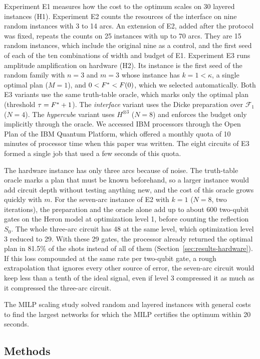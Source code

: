 Experiment E1 measures how the cost to the optimum scales on 30 layered instances (H1). Experiment E2 counts the resources of the interface on nine random instances with 3 to 14 arcs. An extension of E2, added after the protocol was fixed, repeats the counts on 25 instances with up to 70 arcs. They are 15 random instances, which include the original nine as a control, and the first seed of each of the ten combinations of width and budget of E1. Experiment E3 runs amplitude amplification on hardware (H2). Its instance is the first seed of the random family with $n=3$ and $m=3$ whose instance has $k=1<\kappa$, a single optimal plan ($M=1$), and $0<F^{*}<F(0)$, which we selected automatically. Both E3 variants use the same truth-table oracle, which marks only the optimal plan (threshold $\tau=F^{*}+1$). The \emph{interface} variant uses the Dicke preparation over $\mathcal{F}_1$ ($N=4$). The \emph{hypercube} variant uses $H^{\otimes 3}$ ($N=8$) and enforces the budget only implicitly through the oracle. We accessed IBM processors through the Open Plan of the IBM Quantum Platform, which offered a monthly quota of 10 minutes of processor time when this paper was written. The eight circuits of E3 formed a single job that used a few seconds of this quota.

The hardware instance has only three arcs because of noise. The truth-table oracle marks a plan that must be known beforehand, so a larger instance would add circuit depth without testing anything new, and the cost of this oracle grows quickly with $m$. For the seven-arc instance of E2 with $k=1$ ($N=8$, two iterations), the preparation and the oracle alone add up to about 600 two-qubit gates on the Heron model at optimization level 1, before counting the reflection $S_0$. The whole three-arc circuit has 48 at the same level, which optimization level 3 reduced to 29. With these 29 gates, the processor already returned the optimal plan in 81.5\% of the shots instead of all of them (Section~\ref{sec:results-hardware}). If this loss compounded at the same rate per two-qubit gate, a rough extrapolation that ignores every other source of error, the seven-arc circuit would keep less than a tenth of the ideal signal, even if level 3 compressed it as much as it compressed the three-arc circuit.

The MILP scaling study solved random and layered instances with general costs to find the largest networks for which the MILP certifies the optimum within 20 seconds.

\subsection{Methods}\label{sec:method-methods}

